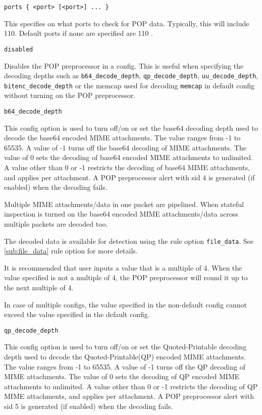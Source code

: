 \documentclass[english]{report}
\newcounter{slistnum}
\newenvironment{slist}
{ \begin{list}{ {\bf \arabic{slistnum}.} }{\usecounter{slistnum} } }
{ \end{list} }
\begin{document}
\begin{slist}

\item \texttt{ports \{ <port> [<port>] ... \}}

This specifies on what ports to check for POP data.  Typically, this will
include 110. Default ports if none are specified are 110 .

\item \texttt{disabled}

Disables the POP preprocessor in a config. This is useful when specifying
the decoding depths such as \texttt{b64\_decode\_depth}, \texttt{qp\_decode\_depth},
\texttt{uu\_decode\_depth}, \texttt{bitenc\_decode\_depth} or the memcap used for
decoding \texttt{memcap} in default config without turning on the POP preprocessor.

\item \texttt{b64\_decode\_depth}

This config option is used to turn off/on or set the base64 decoding depth used to
decode the base64 encoded MIME attachments. The value ranges from -1 to 65535.
A value of -1 turns off the base64 decoding of MIME attachments. The value of 0
sets the decoding of base64 encoded MIME attachments to unlimited. A value other
than 0 or -1 restricts the decoding of base64 MIME attachments, and applies per 
attachment. A POP preprocessor alert with sid 4 is generated (if enabled) when the decoding fails.

Multiple MIME attachments/data in one packet are pipelined. When stateful inspection
is turned on the base64 encoded MIME attachments/data across multiple packets are decoded too.

The decoded data is available for detection using the rule option \texttt{file\_data}.
See \ref{sub:file_data} rule option for more details.

It is recommended that user inputs a value that is a multiple of 4. When the value specified 
is not a multiple of 4, the POP preprocessor will round it up to the next multiple of 4.

In case of multiple configs, the value specified in the non-default config cannot
exceed the value specified in the default config.

\item \texttt{qp\_decode\_depth}

This config option is used to turn off/on or set the Quoted-Printable decoding depth
used to decode the Quoted-Printable(QP) encoded MIME attachments. The value ranges
from -1 to 65535. A value of -1 turns off the QP decoding of MIME attachments.
The value of 0 sets the decoding of QP encoded MIME attachments to unlimited. A
value other than 0 or -1 restricts the decoding of QP MIME attachments, and applies per 
attachment. A POP preprocessor alert with sid 5 is generated (if enabled) when the decoding fails.


\end{slist}
\end{document}
